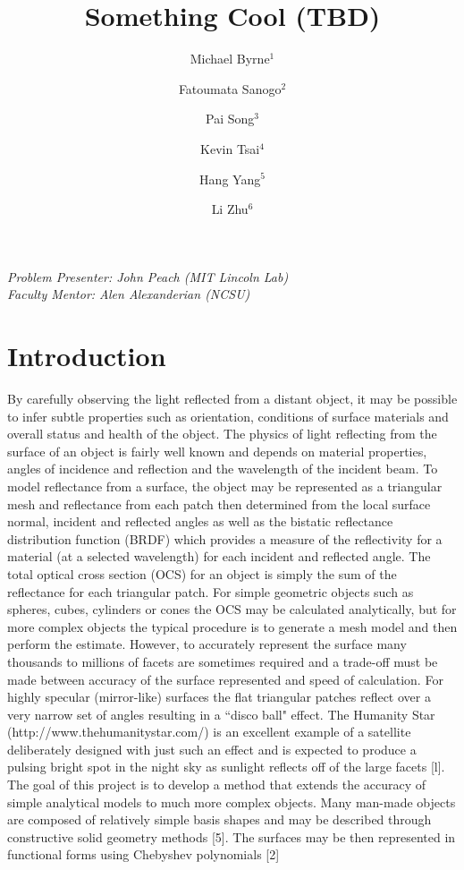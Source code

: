 \documentclass[11pt]{amsart}
\author{Michael Byrne$^1$}
\author{Fatoumata Sanogo$^2$}
\author{Pai Song$^3$}
\author{Kevin Tsai$^4$}
\author{Hang Yang$^5$}
\author{Li Zhu$^6$}
\title{Something Cool (TBD)}
\theoremstyle{definition}
\begin{document}
\maketitle
{\noindent
\textit{Problem Presenter:  John Peach (MIT Lincoln Lab)\\
Faculty Mentor: Alen Alexanderian (NCSU)}}

\tableofcontents

\section{Introduction}
By carefully observing the light reflected from a distant object, it may be possible to infer subtle properties such as
orientation, conditions of surface materials and overall status and health of the object. The physics of light reflecting from
the surface of an object is fairly well known and depends on material properties, angles of incidence and reflection and the
wavelength of the incident beam. To model reflectance from a surface, the object may be represented as a triangular mesh
and reflectance from each patch then determined from the local surface normal, incident and reflected angles as well as the
bistatic reflectance distribution function (BRDF) which provides a measure of the reflectivity for a material (at a selected
wavelength) for each incident and reflected angle.
The total optical cross section (OCS) for an object is simply the sum of the reflectance for each triangular patch. For
simple geometric objects such as spheres, cubes, cylinders or cones the OCS may be calculated analytically, but for more
complex objects the typical procedure is to generate a mesh model and then perform the estimate. However, to accurately
represent the surface many thousands to millions of facets are sometimes required and a trade-off must be made between
accuracy of the surface represented and speed of calculation. For highly specular (mirror-like) surfaces the flat triangular
patches reflect over a very narrow set of angles resulting in a ``disco ball" effect. The Humanity Star
(http://www.thehumanitystar.com/) is an excellent example of a satellite deliberately designed with just such an effect and
is expected to produce a pulsing bright spot in the night sky as sunlight reflects off of the large facets [l].
The goal of this project is to develop a method that extends the accuracy of simple analytical models to much more complex
objects. Many man-made objects are composed of relatively simple basis shapes and may be described through constructive
solid geometry methods [5]. The surfaces may be then represented in functional forms using Chebyshev polynomials [2]
\end{document}
